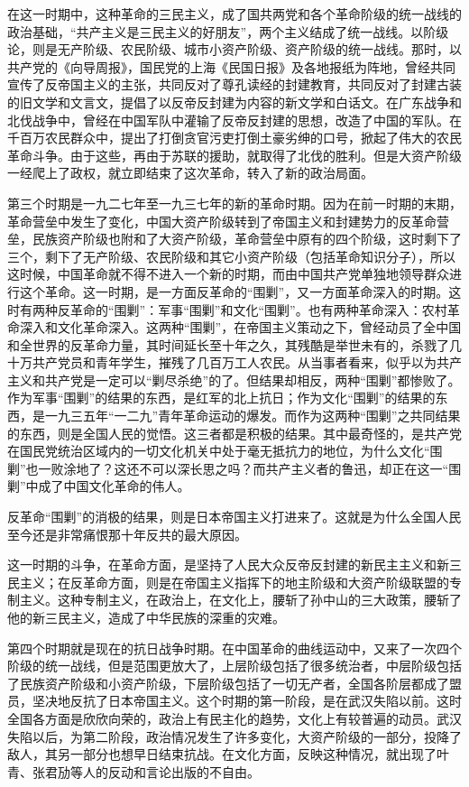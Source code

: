 在这一时期中，这种革命的三民主义，成了国共两党和各个革命阶级的统一战线的政治基础，“共产主义是三民主义的好朋友”，两个主义结成了统一战线。以阶级论，则是无产阶级、农民阶级、城市小资产阶级、资产阶级的统一战线。那时，以共产党的《向导周报》，国民党的上海《民国日报》及各地报纸为阵地，曾经共同宣传了反帝国主义的主张，共同反对了尊孔读经的封建教育，共同反对了封建古装的旧文学和文言文，提倡了以反帝反封建为内容的新文学和白话文。在广东战争和北伐战争中，曾经在中国军队中灌输了反帝反封建的思想，改造了中国的军队。在千百万农民群众中，提出了打倒贪官污吏打倒土豪劣绅的口号，掀起了伟大的农民革命斗争。由于这些，再由于苏联的援助，就取得了北伐的胜利。但是大资产阶级一经爬上了政权，就立即结束了这次革命，转入了新的政治局面。

第三个时期是一九二七年至一九三七年的新的革命时期。因为在前一时期的末期，革命营垒中发生了变化，中国大资产阶级转到了帝国主义和封建势力的反革命营垒，民族资产阶级也附和了大资产阶级，革命营垒中原有的四个阶级，这时剩下了三个，剩下了无产阶级、农民阶级和其它小资产阶级（包括革命知识分子），所以这时候，中国革命就不得不进入一个新的时期，而由中国共产党单独地领导群众进行这个革命。这一时期，是一方面反革命的“围剿”，又一方面革命深入的时期。这时有两种反革命的“围剿”：军事“围剿”和文化“围剿”。也有两种革命深入：农村革命深入和文化革命深入。这两种“围剿”，在帝国主义策动之下，曾经动员了全中国和全世界的反革命力量，其时间延长至十年之久，其残酷是举世未有的，杀戮了几十万共产党员和青年学生，摧残了几百万工人农民。从当事者看来，似乎以为共产主义和共产党是一定可以“剿尽杀绝”的了。但结果却相反，两种“围剿”都惨败了。作为军事“围剿”的结果的东西，是红军的北上抗日；作为文化“围剿”的结果的东西，是一九三五年“一二九”青年革命运动的爆发。而作为这两种“围剿”之共同结果的东西，则是全国人民的觉悟。这三者都是积极的结果。其中最奇怪的，是共产党在国民党统治区域内的一切文化机关中处于毫无抵抗力的地位，为什么文化“围剿”也一败涂地了？这还不可以深长思之吗？而共产主义者的鲁迅，却正在这一“围剿”中成了中国文化革命的伟人。

反革命“围剿”的消极的结果，则是日本帝国主义打进来了。这就是为什么全国人民至今还是非常痛恨那十年反共的最大原因。

这一时期的斗争，在革命方面，是坚持了人民大众反帝反封建的新民主主义和新三民主义；在反革命方面，则是在帝国主义指挥下的地主阶级和大资产阶级联盟的专制主义。这种专制主义，在政治上，在文化上，腰斩了孙中山的三大政策，腰斩了他的新三民主义，造成了中华民族的深重的灾难。

第四个时期就是现在的抗日战争时期。在中国革命的曲线运动中，又来了一次四个阶级的统一战线，但是范围更放大了，上层阶级包括了很多统治者，中层阶级包括了民族资产阶级和小资产阶级，下层阶级包括了一切无产者，全国各阶层都成了盟员，坚决地反抗了日本帝国主义。这个时期的第一阶段，是在武汉失陷以前。这时全国各方面是欣欣向荣的，政治上有民主化的趋势，文化上有较普遍的动员。武汉失陷以后，为第二阶段，政治情况发生了许多变化，大资产阶级的一部分，投降了敌人，其另一部分也想早日结束抗战。在文化方面，反映这种情况，就出现了叶青、张君劢等人的反动和言论出版的不自由。

